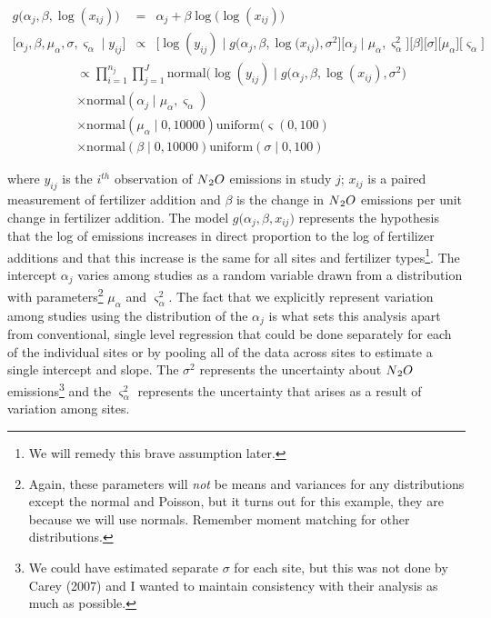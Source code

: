 \documentclass[12pt, oneside]{article}
\begin{document}
\begin{enumerate} [leftmargin=*]
\begin{eqnarray*}
g\big(\alpha_{j},\beta,\log(x_{ij})\big)&=& \alpha_{j}+\beta\log\big(\log(x_{ij})\big)\\
\big[\alpha_{j},\beta,\mu_{\alpha},\sigma,\varsigma_{\alpha}\mid y_{ij}\big] & \propto & \big[\log(y_{ij})\mid g\big(\alpha_{j},\beta,\log(x_{ij}\big),\sigma^{2}\big]\big[\alpha_{j}\mid\mu_{\alpha},\varsigma_{\alpha}^{2}\big]\big[\beta\big]\big[\sigma\big]\big[\mu_{\alpha}\big]\big[\varsigma_{\alpha}\big]\label{eq:mean model for N02 intecept}\
\end{eqnarray*}
\begin{align*}
[\bm{\alpha},\beta,\sigma,\mu_\alpha,\varsigma_\alpha \mid \mathbf{y}]&\propto \prod_{i=1}^{n_j} \prod_{j=1}^{J}\text{normal}(\log(y_{ij})\mid g\big(\alpha_j,\beta,\log(x_{ij}),\sigma^2\big)\\
&\times \text{normal}(\alpha_j \mid\mu_{\alpha},\varsigma_{\alpha})\\
&\times\text{normal}(\mu_{\alpha}\mid 0,10000)\text{uniform}(\varsigma(0,100)\\
&\times\text{normal}(\beta \mid 0,10000)\text{uniform}(\sigma\mid0,100)
\end{align*}

where $y_{ij}$ is the $i^{th}$ observation of $N\textsubscript{2}O$ emissions in study $j$; $x_{ij}$ is a paired measurement of fertilizer addition and $\beta$ is the change in $N\textsubscript{2}O$ emissions per unit change in fertilizer addition. The model $g\big(\alpha_{j},\beta,x_{ij}\big)$ represents the hypothesis that the log of emissions increases in direct proportion to the log of fertilizer additions and that this increase is the same for all sites and fertilizer types\footnote{We will remedy this brave assumption later.}. The intercept $\alpha_{j}$ varies among studies as a random variable drawn from a distribution with parameters\footnote{Again, these parameters will \emph{not} be means and variances for any distributions except the normal and Poisson, but it turns out for this example, they are because we will use normals. Remember moment matching for other distributions.} $\mu_{\alpha}$ and $\varsigma_{\alpha}^{2}$. The fact that we explicitly represent variation among studies using the distribution of the $\alpha_{j}$ is what sets this analysis apart from conventional, single level regression that could be done separately for each of the individual sites or by pooling all of the data across sites to estimate a single intercept and slope. The $\sigma^{2}$ represents the uncertainty about $N\textsubscript{2}O$ emissions\footnote{We could have estimated separate $\sigma$ for each site, but this was not done by Carey (2007) and I wanted to maintain consistency with their analysis as much as possible.} and the $\varsigma_{\alpha}^{2}$ represents the uncertainty that arises as a result of variation among sites.$ $   
\fi


\end{enumerate}
\end{document}
